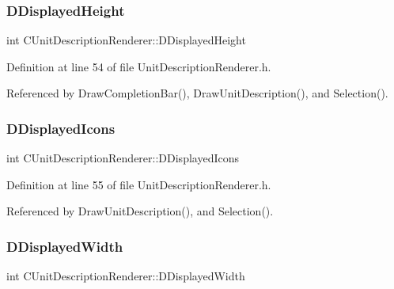 \subsubsection{\texorpdfstring{D\+Displayed\+Height}{DDisplayedHeight}}
{\footnotesize\ttfamily int C\+Unit\+Description\+Renderer\+::\+D\+Displayed\+Height\hspace{0.3cm}{\ttfamily [protected]}}



Definition at line 54 of file Unit\+Description\+Renderer.\+h.



Referenced by Draw\+Completion\+Bar(), Draw\+Unit\+Description(), and Selection().

\hypertarget{classCUnitDescriptionRenderer_a0f2d234d02c615ac28812508c77ec414}{}\label{classCUnitDescriptionRenderer_a0f2d234d02c615ac28812508c77ec414} 
\subsubsection{\texorpdfstring{D\+Displayed\+Icons}{DDisplayedIcons}}
{\footnotesize\ttfamily int C\+Unit\+Description\+Renderer\+::\+D\+Displayed\+Icons\hspace{0.3cm}{\ttfamily [protected]}}



Definition at line 55 of file Unit\+Description\+Renderer.\+h.



Referenced by Draw\+Unit\+Description(), and Selection().

\hypertarget{classCUnitDescriptionRenderer_a4c472ecc82b5956fc65aeebb2faf17fd}{}\label{classCUnitDescriptionRenderer_a4c472ecc82b5956fc65aeebb2faf17fd} 
\subsubsection{\texorpdfstring{D\+Displayed\+Width}{DDisplayedWidth}}
{\footnotesize\ttfamily int C\+Unit\+Description\+Renderer\+::\+D\+Displayed\+Width\hspace{0.3cm}{\ttfamily [protected]}}



